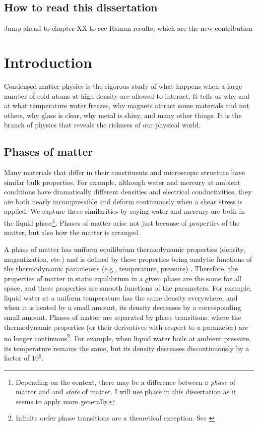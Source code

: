 \section*{How to read this dissertation}

Jump ahead to chapter XX to see Raman results, which are the new contribution

\chapter{Introduction}
Condensed matter physics is the rigorous study of what happens when a large number of cold atoms at high density are allowed to interact. It tells us why and at what temperature water freezes, why magnets attract some materials and not others, why glass is clear, why metal is shiny, and many other things. It is the branch of physics that reveals the richness of our physical world.

\section{Phases of matter}
Many materials that differ in their constituents and microscopic structure have similar bulk properties. For example, although water and mercury at ambient conditions have dramatically different densities and electrical conductivities, they are both nearly incompressible and deform continuously when a shear stress is applied. We capture these similarities by saying water and mercury are both in the liquid phase\footnote{Depending on the context, there may be a difference between a \textit{phase} of matter and and \textit{state} of matter. I will use phase in this dissertation as it seems to apply more generally.}. Phases of matter arise not just because of properties of the matter, but also how the matter is arranged.

A phase of matter has uniform equilibrium thermodynamic properties (density, magentization, etc.) and is defined by these properties being analytic functions of the thermodynamic parameters (e.g., temperature, pressure) \cite{Pathria2011}. Therefore, the properties of matter in static equilibrium in a given phase are the same for all space, and these properties are smooth functions of the parameters. For example, liquid water at a uniform temperature has the same density everywhere, and when it is heated by a small amount, its density decreases by a corresponding small amount. Phases of matter are separated by phase transitions, where the thermodynamic properties (or their derivatives with respect to a parameter) are no longer continuous\footnote{Infinite order phase transitions are a theoretical exception. See \cite{Costin1990}}. For example, when liquid water boils at ambient pressure, its temperature remains the same, but its density decreases discontinuously by a factor of $10^6$.

